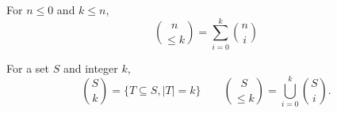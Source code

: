 \documentclass[a4paper,justified]{tufte-handout}
\begin{document}
For $ n\leq 0 $ and $ k\leq n $,
\begin{equation*}
  \binom{n}{\leq k} = \sum^{k}_{i=0}\binom{n}{i} 
\end{equation*}

For a set $ S $ and integer $k$,
\begin{equation*}
  \binom{S}{k}= \{ T \subseteq S, |T|=k  \} \qquad \binom{S}{\leq k} =
  \bigcup^{k}_{i=0} \binom{S}{i}.
\end{equation*}


% 
% 
\end{document}

